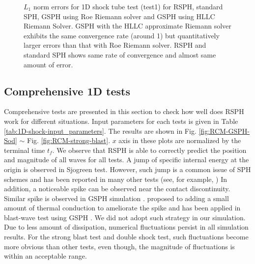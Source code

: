 \documentclass[review]{elsarticle}
\begin{document}
\begin{figure}[H]
\begin{minipage}{.332\textwidth}
    \end{minipage}%
    \caption{ $L_1$ norm errors for 1D shock tube test (test1) for RSPH, standard SPH, GSPH using Roe Riemann solver and GSPH using HLLC Riemann Solver.  GSPH with the HLLC approximate Riemann solver exhibits the same convergence rate (around 1) but quantitatively larger errors than that with Roe Riemann solver. RSPH and standard SPH shows same rate of convergence and almost same amount of error.}
    \label{fig:Accuracy-test1}
\end{figure}
 
\subsection{Comprehensive 1D tests} \label{sec:comprehensive-1d-tests}
Comprehensive tests are presented in this section to check how well does RSPH work for different situations. Input parameters for each tests is given in Table \ref{tab:1D-shock-input_parameters}.
The results are shown in Fig. \ref{fig:RCM-GSPH-Sod} $\sim$ Fig. \ref{fig:RCM-strong-blast}. $x$ axis in these plots are normalized by the terminal time $t_f$. We observe that RSPH is able to correctly predict the position and magnitude of all waves for all tests. A jump of specific internal energy at the origin is observed in Sjogreen test. However, such jump is a common issue of SPH schemes and has been reported in many other tests (see, for example, \citep{monaghan1997sph,cha2003implementations,puri2014approximate})
In addition, a noticeable spike can be observed near the contact discontinuity. Similar spike is observed in GSPH simulation \citep{puri2014comparison}. %
\citep{noh1987errors} proposed to adding a small amount of thermal conduction to ameliorate the spike and has been applied in blast-wave test using GSPH \citep{puri2014comparison}. We did not adopt such strategy in our simulation.
Due to less amount of dissipation, numerical fluctuations persist in all simulation results. For the strong blast test and double shock test, such fluctuations become more obvious than other tests, even though, the magnitude of fluctuations is within an acceptable range.
\end{document}
